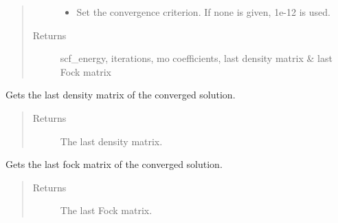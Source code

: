 \documentclass[letterpaper,10pt,english]{sphinxmanual}
\begin{document}
\begin{fulllineitems}
\begin{fulllineitems}
\begin{quote}
\begin{description}
\begin{itemize}
\item {} 
 \textendash{} Set the convergence criterion. If none is given, 1e-12 is used.

\end{itemize}

\item[{Returns}] \leavevmode
scf\_energy, iterations, mo coefficients, last density matrix \& last Fock matrix

\end{description}\end{quote}

\end{fulllineitems}


\begin{fulllineitems}
\label{\detokenize{Complex_GHF:ghf.complex_GHF.ComplexGHF.get_last_dens}}
Gets the last density matrix of the converged solution.
\begin{quote}\begin{description}
\item[{Returns}] \leavevmode
The last density matrix.

\end{description}\end{quote}

\end{fulllineitems}


\begin{fulllineitems}
\label{\detokenize{Complex_GHF:ghf.complex_GHF.ComplexGHF.get_last_fock}}
Gets the last fock matrix of the converged solution.
\begin{quote}\begin{description}
\item[{Returns}] \leavevmode
The last Fock matrix.

\end{description}\end{quote}

\end{fulllineitems}


\end{fulllineitems}
\end{document}
